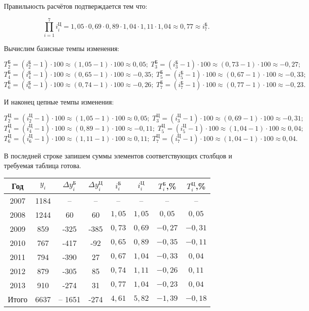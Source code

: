 \documentclass[fleqn]{article}
\begin{document}
Правильность расчётов подтверждается тем что:

$$\prod_{i=1}^7i_i^\textit{Ц}=1,05\cdot0,69\cdot0,89\cdot1,04\cdot1,11\cdot1,04\approx0,77\approx i_7^\textit{Б}.$$

Вычислим базисные темпы изменения:

$$T_2^\textit{Б}=(i_2^\textit{Б}-1)\cdot100\approx(1,05-1)\cdot100\approx0,05;\;T_3^\textit{Б}=(i_3^\textit{Б}-1)\cdot100\approx(0,73-1)\cdot100\approx-0,27;$$
$$T_4^\textit{Б}=(i_4^\textit{Б}-1)\cdot100\approx(0,65-1)\cdot100\approx-0,35;\;T_5^\textit{Б}=(i_5^\textit{Б}-1)\cdot100\approx(0,67-1)\cdot100\approx-0,33;$$
$$T_6^\textit{Б}=(i_6^\textit{Б}-1)\cdot100\approx(0,74-1)\cdot100\approx-0,26;\;T_7^\textit{Б}=(i_7^\textit{Б}-1)\cdot100\approx(0,77-1)\cdot100\approx-0,23.$$

И наконец цепные темпы изменения:

$$T_2^\textit{Ц}=(i_2^\textit{Ц}-1)\cdot100\approx(1,05-1)\cdot100\approx0,05;\;T_3^\textit{Ц}=(i_3^\textit{Ц}-1)\cdot100\approx(0,69-1)\cdot100\approx-0,31;$$
$$T_4^\textit{Ц}=(i_4^\textit{Ц}-1)\cdot100\approx(0,89-1)\cdot100\approx-0,11;\;T_5^\textit{Ц}=(i_5^\textit{Ц}-1)\cdot100\approx(1,04-1)\cdot100\approx0,04;$$
$$T_6^\textit{Ц}=(i_6^\textit{Ц}-1)\cdot100\approx(1,11-1)\cdot100\approx0,11;\;T_7^\textit{Ц}=(i_7^\textit{Ц}-1)\cdot100\approx(1,04-1)\cdot100\approx0,04.$$

В последней строке запишем суммы элементов соответствующих столбцов и требуемая таблица готова.

\bgroup
\def\arraystretch{1.8}
\setlength{}
\begin{center}
\begin{tabular}{|c|c|c|c|c|c|c|c|}
\hline
Год & $y_i$ & $\Delta y_i^\textit{Б}$ & $\Delta y_i^\textit{Ц}$ & $i_i^\textit{Б}$ & $i_i^\textit{Ц}$ & $T_i^\textit{Б}$,\% & $T_i^\textit{Ц}$,\% \\
\hline
2007 & 1184 & -- & -- & -- & -- & -- & -- \\
\hline
2008 & 1244 & 60 & 60 & $1,05$ & $1,05$ & $0,05$ & $0,05$ \\
\hline
2009 & 859 & -325 & -385 & $0,73$ & $0,69$ & $-0,27$ & $-0,31$ \\
\hline
2010 & 767 & -417 & -92 & $0,65$ & $0,89$ & $-0,35$ & $-0,11$ \\
\hline
2011 & 794 & -390 & 27 & $0,67$ & $1,04$ & $-0,33$ & $0,04$ \\
\hline
2012 & 879 & -305 & 85 & $0,74$ & $1,11$ & $-0,26$ & $0,11$ \\
\hline
2013 & 910 & -274 & 31 & $0,77$ & $1,04$ & $-0,23$ & $0,04$ \\
\hline
Итого & 6637 & – 1651 & -274 & $4,61$ & $5,82$ & $−1,39$ & $−0,18$ \\
\hline
\end{tabular}
\end{center}
\egroup
\end{document}
